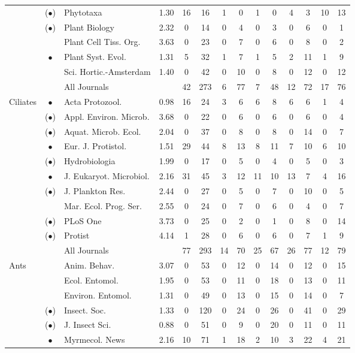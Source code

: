 \documentclass[webpdf,PV,mynatbib,surname,CE,MSC]{SYS-PV}
\begin{document}
\begin{table*}[!p]
{\begin{tabular*}{\textwidth}{@{\extracolsep{\fill}}lclccccccccccc@{}}
~& ($\bullet$)& Phytotaxa & 1.30&  16& 16&  1& 0&  1& 0& 4& 3& 10&13 \\
~& ($\bullet$)& Plant Biology& 2.32&  0& 14& 0& 4&  0& 3&  0& 6&  0&1 \\
~& ~& Plant Cell Tiss. Org.& 3.63&  0& 23& 0& 7& 0& 6&  0& 8& 0&2 \\
~& $\bullet$& Plant Syst. Evol.& 1.31&  5& 32&  1& 7&  1& 5& 2& 11&  1&9 \\
~& ~& Sci. Hortic.-Amsterdam& 1.40&  0& 42&  0& 10& 0& 8& 0& 12& 0&12 \\
& & All Journals& & 42& 273&  6& 77& 7& 48&  12& 72&  17&76 \\
Ciliates& $\bullet$& Acta Protozool.& 0.98& 16& 24& 3& 6& 6& 8& 6& 6& 1&4 \\
~& ($\bullet$)& Appl. Environ. Microb.& 3.68& 0& 22&  0& 6&  0& 6& 0& 6& 0&4 \\
~& ($\bullet$)& Aquat. Microb. Ecol.& 2.04& 0& 37& 0& 8& 0& 8& 0& 14& 0&7 \\
~& $\bullet$& Eur. J. Protistol.& 1.51&  29& 44&  8& 13& 8& 11& 7& 10& 6&10 \\
~& ($\bullet$)& Hydrobiologia & 1.99& 0& 17&  0& 5& 0& 4&  0& 5& 0&3 \\
~& $\bullet$& J. Eukaryot. Microbiol.& 2.16& 31& 45&  3& 12&  11& 10&  13& 7&  4&16 \\
~& ($\bullet$)& J. Plankton Res.& 2.44&  0& 27& 0& 5&  0& 7& 0& 10&  0&5 \\
~& ~& Mar. Ecol. Prog. Ser.& 2.55&  0& 24&  0& 7&  0& 6&  0& 4& 0&7 \\
~& ($\bullet$)& PLoS One & 3.73& 0& 25&  0& 2&  0& 1&  0& 8&  0&14 \\
~& ($\bullet$)& Protist & 4.14&  1& 28& 0& 6&  0& 6& 0& 7&  1&9 \\
\textbf{~}& \textbf{~}& All Journals& ~&  77& 293&  14& 70& 25& 67& 26& 77& 12&79 \\
Ants& ~& Anim. Behav.& 3.07&  0& 53&  0& 12& 0& 14&  0& 12&  0&15 \\
~& ~& Ecol. Entomol.& 1.95&  0& 53&  0& 11&  0& 18&  0& 13&  0&11 \\
~& ~& Environ. Entomol.& 1.31&  0& 49&  0& 13&  0& 15&  0& 14&  0&7 \\
~& ($\bullet$)& Insect. Soc.& 1.33&  0& 120& 0& 24& 0& 26&  0& 41& 0&29 \\
~& ($\bullet$)& J. Insect Sci.& 0.88&  0& 51&  0& 9& 0& 20& 0& 11& 0&11 \\
~& $\bullet$& Myrmecol. News & 2.16&  10& 71&  1& 18& 2& 10&  3& 22&  4&21 \\

\end{tabular*}}
\end{table*}
\end{document}
